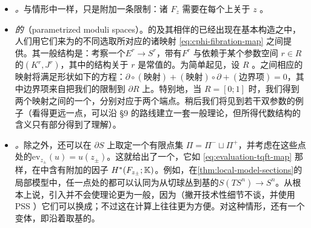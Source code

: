 \begin{itemize}
\item \emph{\trMovingBoundaryCondition。}与\trCompact{}情形中一样，只是附加一条限制：诸 $F_z$ 需要在每个\trStriplikeEnd{}上关于 $z$ \trLocallyConstant。
\item \emph{\trParametrization{}的\trModuliSpace}（parametrized moduli spaces）。\trLefschetzFibration{}的\trFamily{}及其相伴的\trModuliSpace{}已经出现在基本构造之中，人们用它们来为\trRelative\trPerturbationDatum{}的不同选取所对应的诸映射 \eqref{eq:cphi-fibration-map} 之间提供\trChainHomotopy。其一般结构是：考察一个\trFamily{}$E^r\to S^r$，带有\trLagrange\trBoundaryCondition{}$F^r$ 与依赖于某个参数空间 $r\in R$ 的\trPerturbationDatum{}$(K^r,J^r)$，其中\trStriplikeEnd{}的结构关于 $r$ 是常值的。为简单起见，设 $R$ \trCompact。\trFloerCochainGroup{}之间相应的映射将满足形状如下的方程：$\partial\circ(\text{映射})+(\text{映射})\circ\partial+(\text{边界项})=0$，其中边界项来自把我们的\trFamily{}限制到 $\partial R$ 上。特别地，当 $R=[0;1]$ 时，我们得到两个映射之间的一个\trChainHomotopy，分别对应于两个端点。稍后我们将见到若干双参数的例子（看得更远一点，可以沿 §9 的路线建立一套一般理论，但所得代数结构的含义只有部分得到了理解）。
\item \emph{\trEvaluationMap。}除\trStriplikeEnd{}之外，还可以在 $\partial S$ 上取定一个有限点集 $\Pi=\Pi^-\sqcup\Pi^+$，并考虑在这些点处的\trEvaluationMap{}$\mathrm{ev}_{z_\pm}(u)=u(z_\pm)$。这就给出了一个\trInvariant，它如 \eqref{eq:evaluation-tqft-map} 那样，在\trTensorProduct{}中含有附加的因子 $H^*(F_{z_\pm};\mathbb{K})$。例如，在\cref{thm:local-model-sections}的局部模型中，任一点处的\trEvaluationMap{}都可以认同为从切球丛到基的\trProjection{}$S(TS^n)\to S^n$。从根本上说，引入\trMarkedPoint{}并不会使理论更为一般，因为（撇开技术性细节不谈，并使用 PSS \trIsomorphism）它们可以换成\trStriplikeEnd；不过这在计算上往往更为方便。对这种情形，\trCompositionLaw{}还有一个变体，即沿着\trMarkedPoint{}取基\trSurface{}的\trBoundaryConnectedSum。
\end{itemize}
